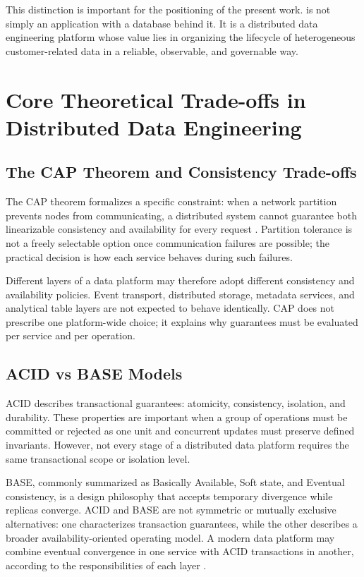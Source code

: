 This distinction is important for the positioning of the present work. \projectname{} is not simply an application with a database behind it. It is a distributed data engineering platform whose value lies in organizing the lifecycle of heterogeneous customer-related data in a reliable, observable, and governable way.

\section{Core Theoretical Trade-offs in Distributed Data Engineering}

\subsection{The CAP Theorem and Consistency Trade-offs}
The CAP theorem formalizes a specific constraint: when a network partition prevents nodes from communicating, a distributed system cannot guarantee both linearizable consistency and availability for every request \cite{gilbert2002brewer}. Partition tolerance is not a freely selectable option once communication failures are possible; the practical decision is how each service behaves during such failures.

Different layers of a data platform may therefore adopt different consistency and availability policies. Event transport, distributed storage, metadata services, and analytical table layers are not expected to behave identically. CAP does not prescribe one platform-wide choice; it explains why guarantees must be evaluated per service and per operation.

\subsection{ACID vs BASE Models}
ACID describes transactional guarantees: atomicity, consistency, isolation, and durability. These properties are important when a group of operations must be committed or rejected as one unit and concurrent updates must preserve defined invariants. However, not every stage of a distributed data platform requires the same transactional scope or isolation level.

BASE, commonly summarized as Basically Available, Soft state, and Eventual consistency, is a design philosophy that accepts temporary divergence while replicas converge. ACID and BASE are not symmetric or mutually exclusive alternatives: one characterizes transaction guarantees, while the other describes a broader availability-oriented operating model. A modern data platform may combine eventual convergence in one service with ACID transactions in another, according to the responsibilities of each layer \cite{kleppmann2017ddia}.

